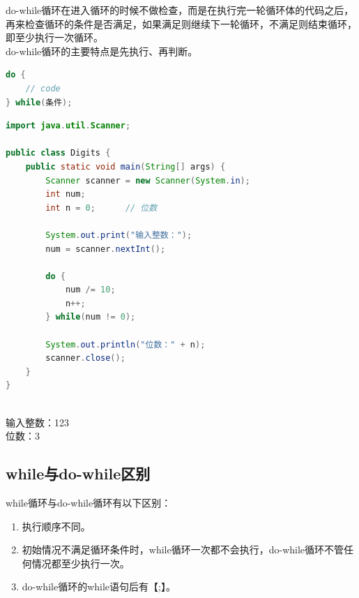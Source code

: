 do-while循环在进入循环的时候不做检查，而是在执行完一轮循环体的代码之后，再来检查循环的条件是否满足，如果满足则继续下一轮循环，不满足则结束循环，即至少执行一次循环。 \\

do-while循环的主要特点是先执行、再判断。

\vspace{-0.5cm}

\begin{lstlisting}[language=Java]
do {
    // code
} while(条件);
\end{lstlisting}

\vspace{0.5cm}


\begin{lstlisting}[language=Java]
import java.util.Scanner;

public class Digits {
    public static void main(String[] args) {
        Scanner scanner = new Scanner(System.in);
        int num;
        int n = 0;      // 位数
        
        System.out.print("输入整数：");
        num = scanner.nextInt();
        
        do {
            num /= 10;
            n++;
        } while(num != 0);
        
        System.out.println("位数：" + n);
        scanner.close();
    }
}
\end{lstlisting}

\begin{tcolorbox}
	 \\
	输入整数：123 \\
	位数：3
\end{tcolorbox}

\subsection{while与do-while区别}

while循环与do-while循环有以下区别：

\begin{enumerate}
	\item 执行顺序不同。

	\item 初始情况不满足循环条件时，while循环一次都不会执行，do-while循环不管任何情况都至少执行一次。

	\item do-while循环的while语句后有【;】。
\end{enumerate}

